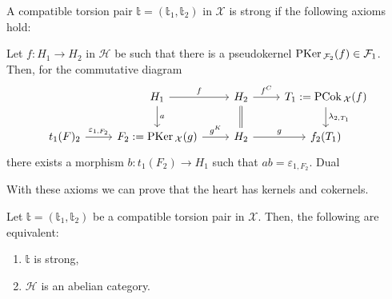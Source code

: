 \begin{definition}
  A compatible torsion pair $\mathbb{t}=(\mathbb{t}_1,\mathbb{t}_2)$ in $\mathcal{X}$
  is strong if the following axioms hold:
  \begin{torsionaxioms}
    \setcounter{enumi}{3}
    \item Let $f:H_1\to H_2$ in $\mathcal{H}$ be such that there is a pseudokernel
    $\mathrm{\textup{PKer\,}}_{\mathcal{F}_2}(f)\in\mathcal{F}_1$. Then, for the commutative diagram
    \begin{equation*}
      \begin{tikzcd}
        & H_1\arrow{d}{a}\arrow{r}{f}
          & H_2\arrow[equal]{d}\arrow{r}{f^C}
            & T_1:=\PCok_\mathcal{X}(f)\arrow{d}{\lambda_{2,T_1}}\\
        t_1(F)_2\arrow{r}{\varepsilon_{1,F_2}}
        & F_2:=\PKer_\mathcal{X}(g)\arrow{r}{g^K}
          & H_2\arrow{r}{g}
            & f_2(T_1)
      \end{tikzcd}
    \end{equation*}
    there exists a morphism $b:t_1(F_2)\to H_1$ such that $ab=\varepsilon_{1,F_2}$.
    \varitem{^\ast} Dual
  \end{torsionaxioms}
\end{definition}

With these axioms we can prove that the heart has kernels and cokernels.

\begin{thm}
  Let $\mathbb{t}=(\mathbb{t}_1,\mathbb{t}_2)$ be a compatible torsion pair in $\mathcal{X}$. Then, the following are
  equivalent:
  \begin{enumerate}[label=(\alph*)]
    \item $\mathbb{t}$ is strong,
    \item $\mathcal{H}$ is an abelian category.
  \end{enumerate}
\end{thm}

